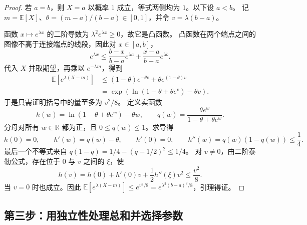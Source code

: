 \documentclass[UTF8]{ctexart}
\begin{document}
\begin{proof}
若 $a=b$，则 $X=a$ 以概率 $1$ 成立，等式两侧均为 $1$。以下设 $a<b$。
记 $m=\mathbb E[X]$、$\theta=(m-a)/(b-a)\in[0,1]$，并令 $v=\lambda(b-a)$。

函数 $x\mapsto e^{\lambda x}$ 的二阶导数为 $\lambda^2e^{\lambda x}\geq0$，故它是凸函数。
凸函数在两个端点之间的图像不高于连接端点的线段，因此对 $x\in[a,b]$，
\[
  e^{\lambda x}\leq
  \frac{b-x}{b-a}e^{\lambda a}
  +\frac{x-a}{b-a}e^{\lambda b}.
\]
代入 $X$ 并取期望，再乘以 $e^{-\lambda m}$，得到
\begin{align*}
  \mathbb E[e^{\lambda(X-m)}]
  &\leq (1-\theta)e^{-\theta v}+\theta e^{(1-\theta)v}\\
  &=\exp\!\left(\ln(1-\theta+\theta e^v)-\theta v\right).
\end{align*}
于是只需证明括号中的量至多为 $v^2/8$。
定义实函数
\[
  h(w)=\ln(1-\theta+\theta e^w)-\theta w,
  \qquad q(w)=\frac{\theta e^w}{1-\theta+\theta e^w}.
\]
分母对所有 $w\in\mathbb R$ 都为正，且 $0\leq q(w)\leq1$。求导得
\[
  h(0)=0,\qquad h'(w)=q(w)-\theta,\qquad h'(0)=0,
  \qquad h''(w)=q(w)(1-q(w))\leq\frac14.
\]
最后一个不等式来自 $q(1-q)=1/4-(q-1/2)^2\leq1/4$。
对 $v\ne0$，由二阶泰勒公式，存在位于 $0$ 与 $v$ 之间的 $\xi$，使
\[
  h(v)=h(0)+h'(0)v+\frac12h''(\xi)v^2\leq\frac{v^2}{8}.
\]
当 $v=0$ 时也成立。因此
$\mathbb E[e^{\lambda(X-m)}]\leq e^{v^2/8}
=e^{\lambda^2(b-a)^2/8}$，引理得证。
\end{proof}

\subsection{第三步：用独立性处理总和并选择参数}
\end{document}
